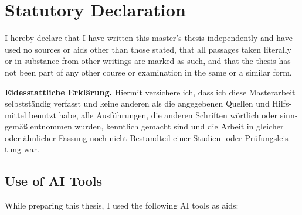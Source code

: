 \chapter*{Statutory Declaration}

I hereby declare that I have written this master's thesis independently and
have used no sources or aids other than those stated, that all passages taken
literally or in substance from other writings are marked as such, and that the
thesis has not been part of any other course or examination in the same or a
similar form.

\ifZweiteSprache
\begin{otherlanguage}{ngerman}
\medskip
\textbf{Eidesstattliche Erklärung.} Hiermit versichere ich, dass ich diese
Masterarbeit selbstständig verfasst und keine anderen als die angegebenen
Quellen und Hilfsmittel benutzt habe, alle Ausführungen, die anderen Schriften
wörtlich oder sinngemäß entnommen wurden, kenntlich gemacht sind und die Arbeit
in gleicher oder ähnlicher Fassung noch nicht Bestandteil einer Studien- oder
Prüfungsleistung war.
\end{otherlanguage}
\fi

\section*{Use of AI Tools}
While preparing this thesis, I used the following AI tools as aids:

